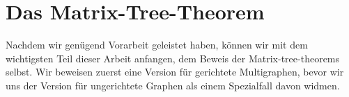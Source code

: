 \section{Das Matrix-Tree-Theorem}

Nachdem wir genügend Vorarbeit geleistet haben, können wir mit dem wichtigsten Teil dieser Arbeit anfangen, dem Beweis der Matrix-tree-theorems selbst. Wir beweisen zuerst eine Version für gerichtete Multigraphen, bevor wir uns der Version für ungerichtete Graphen als einem Spezialfall davon widmen.



